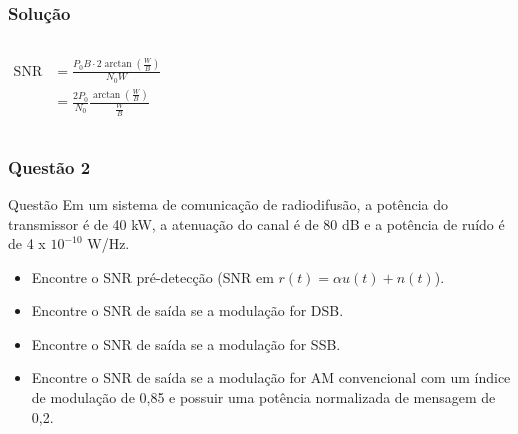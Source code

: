 \documentclass{beamer}
\begin{document}
\begin{frame}
  \frametitle{Solução}

  \begin{columns}
    \begin{align*}
      \text{SNR} &= \frac{P_0 B \cdot 2 \arctan\left(\frac{W}{B}\right)}{N_0 W} \\
      &= \frac{2P_0}{N_0} \frac{\arctan\left(\frac{W}{B}\right)}{\frac{W}{B}}
    \end{align*}
    \begin{figure}
      \centering 
  
  
  
    \end{figure}
    \end{columns}    
\end{frame}


\begin{frame}
  \frametitle{Questão 2}

  \begin{block}{Questão}
    Em um sistema de comunicação de radiodifusão, a 
    potência do transmissor é de 40 kW, a atenuação do canal é de 80 dB e a
     potência de ruído é de 4 x $10^{-10}$ W/Hz.

     \begin{itemize}
      \item Encontre o SNR pré-detecção (SNR em $r(t) = \alpha u(t) + n(t)$).
      \item Encontre o SNR de saída se a modulação for DSB.
      \item Encontre o SNR de saída se a modulação for SSB.
      \item Encontre o SNR de saída se a modulação for AM convencional com um índice de modulação de 0,85 e possuir uma potência normalizada de mensagem de 0,2.
      \end{itemize}
  \end{block}

\end{frame}
\end{document}

